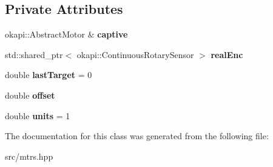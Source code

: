 \subsection*{Private Attributes}
\begin{DoxyCompactItemize}
\item 
\mbox{\label{classExtraSpecialMotorWithExternalSensorsAsEncoders_a6dddf188f2a1a4d2eec58f3948ef2e2f}} 
okapi\+::\+Abstract\+Motor \& {\bfseries captive}
\item 
\mbox{\label{classExtraSpecialMotorWithExternalSensorsAsEncoders_a349485b170fc2662123ff4c535876c67}} 
std\+::shared\+\_\+ptr$<$ okapi\+::\+Continuous\+Rotary\+Sensor $>$ {\bfseries real\+Enc}
\item 
\mbox{\label{classExtraSpecialMotorWithExternalSensorsAsEncoders_af2e13009e8d6e7b9a4b38e855aa778e7}} 
double {\bfseries last\+Target} = 0
\item 
\mbox{\label{classExtraSpecialMotorWithExternalSensorsAsEncoders_aa65162508dc977a0e242f7407b3e049b}} 
double {\bfseries offset}
\item 
\mbox{\label{classExtraSpecialMotorWithExternalSensorsAsEncoders_a5550247e91f7881a790c0bac418101db}} 
double {\bfseries units} = 1
\end{DoxyCompactItemize}


The documentation for this class was generated from the following file\+:\begin{DoxyCompactItemize}
\item 
src/mtrs.\+hpp\end{DoxyCompactItemize}
